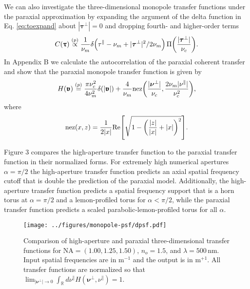 \documentclass[]{osa-article}
\let\originalleft\left
\let\originalright\right
\renewcommand{\left}{\mathopen{}\mathclose\bgroup\originalleft}
\renewcommand{\right}{\aftergroup\egroup\originalright}
\newcommand{\mypar}{\parallel}
\providecommand{\mbb}[1]{\mathbb{#1}}
\providecommand{\bs}[1]{\boldsymbol{#1}}
\providecommand{\bv}{\boldsymbol{\mathfrak{v}}}
\providecommand{\bvperp}{\bs{\nu}^{\bot}}
\providecommand{\bvpar}{\nu^{\parallel}}
\providecommand{\bt}{\bs{\uptau}}
\providecommand{\btperp}{\bs{\tau}^{\bot}}
\providecommand{\btpar}{\tau^{\mypar}}
\providecommand{\eqp}{\stackrel{(p)}{=}}
\providecommand{\propp}{\stackrel{(p)}{\propto}}
\begin{document}
We can also investigate the three-dimensional monopole transfer functions under the paraxial approximation by expanding the argument of the delta function in Eq. \eqref{eq:toexpand} about $|\btperp| = 0$ and dropping fourth- and higher-order terms \begin{align}
  C(\bt) \propp \frac{1}{\nu_m}\delta\left(\btpar - \nu_m + |\btperp|^2/2\nu_m\right)\,\Pi\left(\frac{|\btperp|}{\nu_c}\right).
\end{align}
In Appendix B we calculate the autocorrelation of the paraxial coherent transfer and show that the paraxial monopole transfer function is given by
\begin{align}
  H(\bv) \eqp \frac{\pi\nu_c^2}{4\nu_m^2}\delta(|\bv|) + \frac{4}{\nu_m}\text{nez}\left(\frac{|\bvperp|}{\nu_c}, \frac{2\nu_m|\bvpar|}{\nu_c^2}\right),
\end{align}
where
\begin{align}
 \text{nez}(x, z) = \frac{1}{2|x|}\text{Re}\left[\sqrt{1 - \left(\frac{|z|}{|x|} + |x|\right)^2}\right].
\end{align}

Figure 3 compares the high-aperture transfer function to the paraxial transfer function in their normalized forms. For extremely high numerical apertures $\alpha = \pi/2$ the high-aperture transfer function predicts an axial spatial frequency cutoff that is double the prediction of the paraxial model. Additionally, the high-aperture transfer function predicts a spatial frequency support that is a horn torus at $\alpha = \pi/2$ and a lemon-profiled torus for $\alpha < \pi/2$, while the paraxial transfer function predicts a scaled parabolic-lemon-profiled torus for all $\alpha$. 

\begin{figure}
  \centering
  \texttt{[image: ../figures/monopole-psf/dpsf.pdf]}
  \caption{Comparison of high-aperture and paraxial three-dimensional transfer functions for $\text{NA} = (1.00, 1.25, 1.50)$, $n_o = 1.5$, and $\lambda = 500\,\text{nm}$. Input spatial frequencies are in  m${}^{-1}$ and the output is in m${}^{+1}$. All transfer functions are normalized so that $\lim_{|{\bvperp}|\rightarrow 0} \int_\mbb{R}d\bvpar H(\bvperp, \bvpar) = 1$.}
  \label{fig:compare}
\end{figure}

\end{document}
